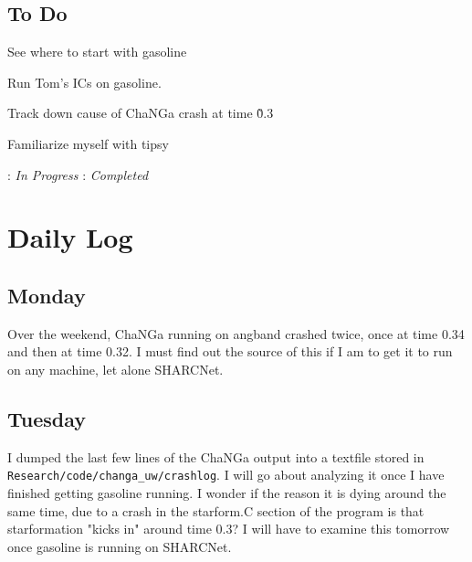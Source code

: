\documentclass[11pt,letterpaper]{article}
\begin{document}
\subsection*{To Do}
\begin{bullets}
\item[\checkmark] See where to start with gasoline
\item[\textleaf] Run Tom's ICs on gasoline.
\item Track down cause of ChaNGa crash at time \~0.3
\item Familiarize myself with tipsy
\end{bullets}

\textleaf : \textit{In Progress} \qquad \checkmark : \textit{Completed}

\section*{Daily Log}
\subsection*{Monday}
Over the weekend, ChaNGa running on angband crashed twice, once at time 0.34 
and then at time 0.32. I must find out the source of this if I am to get it to 
run on any machine, let alone SHARCNet.  

\subsection*{Tuesday}
I dumped the last few lines of the ChaNGa output into a textfile stored in
\verb!Research/code/changa_uw/crashlog!. I will go about analyzing it once I 
have finished getting gasoline running. I wonder if the reason it is dying 
around the same time, due to a crash in the starform.C section of the program
is that starformation "kicks in" around time 0.3?  I will have to examine this
tomorrow once gasoline is running on SHARCNet.\\
\end{document}
